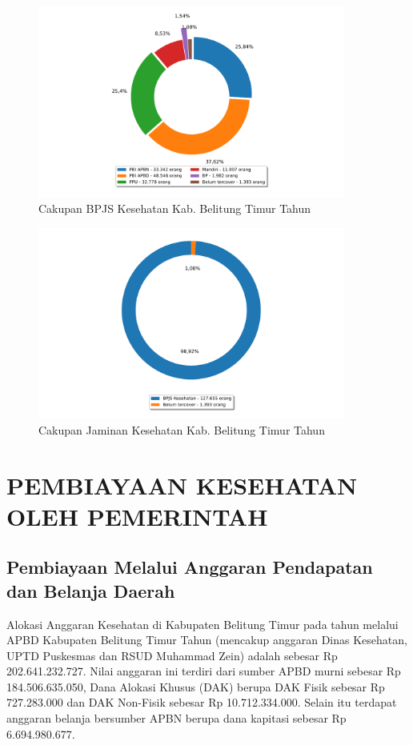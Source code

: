 \begin{figure}[H]
    \centering{}
    \includegraphics[width=0.9\textwidth]{bab_04/bab_04_01_jaminanKesehatan_a}
    \caption{Cakupan BPJS Kesehatan Kab. Belitung Timur Tahun \tP}
    \label{fig:Cakupan-BPJS}
\end{figure}

\begin{figure}[H]
    \centering{}
    \includegraphics[width=0.9\textwidth]{bab_04/bab_04_01_jaminanKesehatan_b}
    \caption{Cakupan Jaminan Kesehatan Kab. Belitung Timur Tahun \tP}
    \label{fig:Cakupan-Jamkes}
\end{figure}

\section[PEMBIAYAAN OLEH PEMERINTAH]{PEMBIAYAAN KESEHATAN OLEH PEMERINTAH}
\subsection{Pembiayaan Melalui Anggaran Pendapatan dan Belanja Daerah}
Alokasi Anggaran Kesehatan di Kabupaten Belitung Timur pada tahun \tP melalui APBD Kabupaten Belitung Timur Tahun \tP (mencakup anggaran Dinas Kesehatan, UPTD Puskesmas dan RSUD Muhammad Zein) adalah sebesar Rp 202.641.232.727. Nilai anggaran ini terdiri dari sumber APBD murni sebesar Rp 184.506.635.050, Dana Alokasi Khusus (DAK) berupa DAK Fisik sebesar Rp 727.283.000 dan DAK Non-Fisik sebesar Rp 10.712.334.000. Selain itu terdapat anggaran belanja bersumber APBN berupa dana kapitasi sebesar Rp 6.694.980.677.

